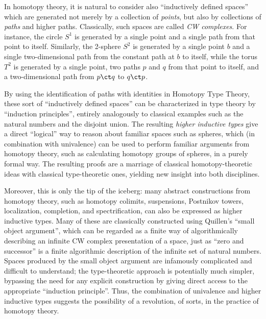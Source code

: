 In homotopy theory, it is natural to consider also ``inductively defined spaces'' which are generated not merely by a collection of \emph{points}, but also by collections of \emph{paths} and higher paths.
Classically, such spaces are called \emph{CW complexes}.
%
For instance, the circle $S^1$ is generated by a single point and a single path from that point to itself.
Similarly, the 2-sphere $S^2$ is generated by a single point $b$ and a single two-dimensional path from the constant path at $b$ to itself, while the torus $T^2$ is generated by a single point, two paths $p$ and $q$ from that point to itself, and a two-dimensional path from $p\ct q$ to $q\ct p$.

By using the identification of paths with identities in Homotopy Type Theory, these sort of ``inductively defined spaces'' can be characterized in type theory by ``induction principles'', entirely analogously to classical examples such as the natural numbers and the disjoint union.
The resulting \emph{higher inductive types}
%
give a direct ``logical'' way to reason about familiar spaces such as spheres, which (in combination with univalence) can be used to perform familiar arguments from homotopy theory, such as calculating homotopy groups of spheres, in a purely formal way.
The resulting proofs are a marriage of classical homotopy-theoretic ideas with classical type-theoretic ones, yielding new insight into both disciplines.

Moreover, this is only the tip of the iceberg: many abstract constructions from homotopy theory, such as homotopy colimits, suspensions, Postnikov towers, localization, completion, and spectrification, can also be expressed as higher inductive types.
Many of these are classically constructed using Quillen's ``small object argument'', which can be regarded as a finite way of algorithmically describing an infinite CW complex presentation of a space, just as ``zero and successor'' is a finite algorithmic description of the infinite set of natural numbers.
Spaces produced by the small object argument are infamously complicated and difficult to understand; the type-theoretic approach is potentially much simpler, bypassing the need for any explicit construction by giving direct access to the appropriate ``induction principle''.
Thus, the combination of univalence and higher inductive types suggests the possibility of a revolution, of sorts, in the practice of homotopy theory.


